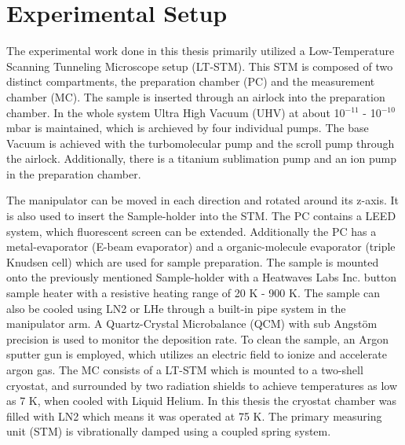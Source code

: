 \chapter{Experimental Setup}
\label{sec:versuchsandordnung}
The experimental work done in this thesis primarily utilized a Low-Temperature Scanning Tunneling Microscope setup (LT-STM).
This STM is composed of two distinct compartments, the preparation chamber (PC) and the measurement chamber (MC).
The sample is inserted through an airlock into the preparation chamber.
In the whole system Ultra High Vacuum (UHV) at about 10$^{-11}$ - 10$^{-10}$ mbar is maintained, which is archieved by four individual pumps.
The base Vacuum is achieved with the turbomolecular pump and the scroll pump through the airlock.
Additionally, there is a titanium sublimation pump and an ion pump in the preparation chamber.


The manipulator can be moved in each direction and rotated around its z-axis.
It is also used to insert the Sample-holder into the STM.
The PC contains a LEED system, which fluorescent screen can be extended. 
Additionally the PC has a metal-evaporator (E-beam evaporator) and a organic-molecule evaporator  (triple Knudsen cell) which are used for sample preparation.
The sample is mounted onto the previously mentioned Sample-holder with a Heatwaves Labs Inc. button sample heater with a resistive heating range of 20 K - 900 K.
The sample can also be cooled using LN2 or LHe through a built-in pipe system in the manipulator arm.
A Quartz-Crystal Microbalance (QCM) with sub Angstöm precision is used to monitor the deposition rate.
To clean the sample, an Argon sputter gun is employed, which utilizes an electric field to ionize and accelerate argon gas.
The MC consists of a LT-STM which is mounted to a two-shell cryostat, and surrounded by two radiation shields to achieve temperatures as low as 7 K, when cooled with Liquid Helium.
In this thesis the cryostat chamber was filled with LN2 which means it was operated at 75 K.
The primary measuring unit (STM) is vibrationally damped using a coupled spring system.

